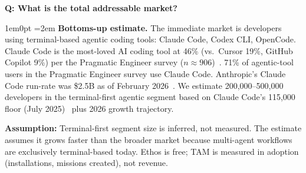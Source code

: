\documentclass[11pt,letterpaper]{article}
\newcounter{faqnum}
\newenvironment{faqpair}[1]{%
  \needspace{4\baselineskip}%
  \vspace{0.5em}%
  \refstepcounter{faqnum}%
  \noindent\textbf{\color{SectionBlue}Q\thefaqnum: #1}\par\nopagebreak[4]%
  \vspace{0.2em}%
  \begin{adjustwidth}{1em}{0pt}%
  \setlength{\parindent}{0pt}%
  \emergencystretch=2em%
}{%
  \end{adjustwidth}%
  \vspace{0.5em}%
}
\begin{document}
\begin{faqpair}{What is the total addressable market?}\label{faq:tam}
\textbf{Bottoms-up estimate.} The immediate market is developers using terminal-based agentic coding tools: Claude Code, Codex CLI, OpenCode. Claude Code is the most-loved AI coding tool at 46\% (vs.\ Cursor 19\%, GitHub Copilot 9\%) per the Pragmatic Engineer survey ($n{\approx}906$)~\cite{pragmaticengsurvey2026}. 71\% of agentic-tool users in the Pragmatic Engineer survey use Claude Code. Anthropic's Claude Code run-rate was \$2.5B as of February 2026~\cite{demandsageclaude2026}. We estimate 200,000--500,000 developers in the terminal-first agentic segment based on Claude Code's 115,000 floor (July 2025)~\cite{claudecode2025stats} plus 2026 growth trajectory.

\textbf{Assumption:} Terminal-first segment size is inferred, not measured. The estimate assumes it grows faster than the broader market because multi-agent workflows are exclusively terminal-based today. Ethos is free; TAM is measured in adoption (installations, missions created), not revenue.
\end{faqpair}
\end{document}
